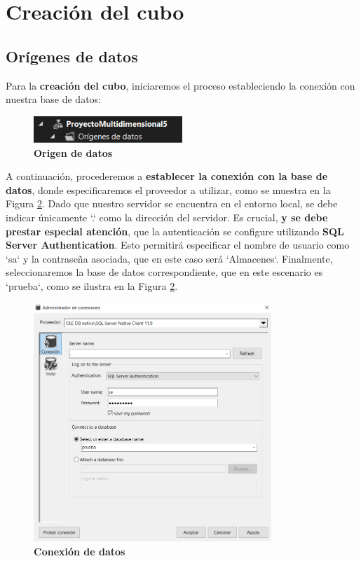 \documentclass[12pt, a4paper, twoside]{article}
\begin{document}
		
	
\section{\textbf{Creación del cubo}}

\subsection{\textbf{Orígenes de datos}}

Para la \textbf{creación del cubo}, iniciaremos el proceso estableciendo la conexión con nuestra base de datos:

\begin{figure}[H]
	\centering
	\includegraphics[width=0.5\textwidth]{image/origenDatos}
	\caption{\textbf{Origen de datos}}
	\label{fig:1}
\end{figure}

A continuación, procederemos a \textbf{establecer la conexión con la base de datos}, donde especificaremos el proveedor a utilizar, como se muestra en la Figura \ref{fig:2}. Dado que nuestro servidor se encuentra en el entorno local, se debe indicar únicamente `.` como la dirección del servidor. Es crucial, \textbf{y se debe prestar especial atención}, que la autenticación se configure utilizando \textbf{SQL Server Authentication}. Esto permitirá especificar el nombre de usuario como `sa` y la contraseña asociada, que en este caso será `Almacenes`. Finalmente, seleccionaremos la base de datos correspondiente, que en este escenario es `prueba`, como se ilustra en la Figura \ref{fig:2}.

\begin{figure}[H]
	\centering
	\includegraphics[width=0.8\textwidth]{image/conexion}
	\caption{\textbf{Conexión de datos}}
	\label{fig:2}
\end{figure}
\end{document}
